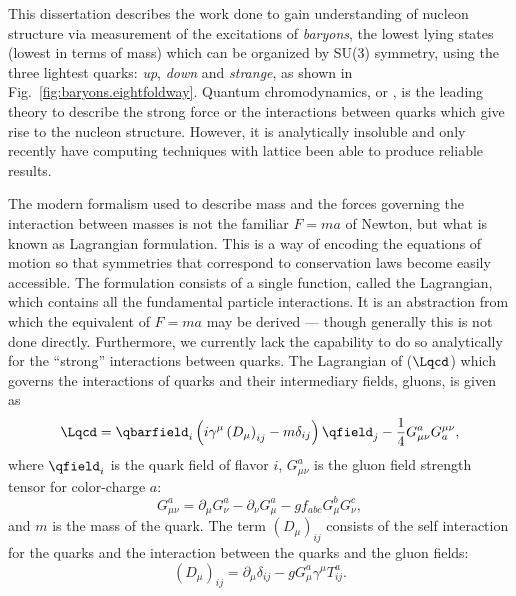 This dissertation describes the work done to gain understanding of nucleon structure via measurement of the excitations of \emph{baryons}, the lowest lying states (lowest in terms of mass) which can be organized by SU(3) symmetry\cite{hassani2000}, using the three lightest quarks: \emph{up}, \emph{down} and \emph{strange}, as shown in Fig.~\ref{fig:baryons.eightfoldway}. Quantum chromodynamics, or , is the leading theory to describe the strong force or the interactions between quarks which give rise to the nucleon structure. However, it is analytically insoluble and only recently have computing techniques with lattice  been able to produce reliable results.


The modern formalism used to describe mass and the forces governing the interaction between masses is not the familiar $F=ma$ of Newton, but what is known as Lagrangian formulation. This is a way of encoding the equations of motion so that symmetries that correspond to conservation laws become easily accessible. The formulation consists of a single function, called the Lagrangian, which contains all the fundamental particle interactions. It is an abstraction from which the equivalent of $F=ma$ may be derived --- though generally this is not done directly. Furthermore, we currently lack the capability to do so analytically for the ``strong'' interactions between quarks. The Lagrangian of  ($\Lqcd$) which governs the interactions of quarks and their intermediary fields, gluons, is given as
\begin{equation}
    \Lqcd =
    \qbarfield_i
    \left( i \gamma^\mu \left( D_\mu \right)_{ij} - m \delta_{ij} \right)
    \qfield_j
    - \frac{1}{4}G^{a}_{\mu\nu}G^{\mu\nu}_{a},
    \label{eqn:qcd_lagrangian}
\end{equation}
where $\qfield_i$ is the quark field of flavor $i$, $G^{a}_{\mu\nu}$ is the gluon field strength tensor for color-charge $a$:
\begin{equation}
    G^{a}_{\mu\nu} =
    \partial_\mu G^{a}_{\nu}
    - \partial_\nu G^{a}_{\mu}
    - g f_{abc} G^{b}_{\mu} G^{c}_{\nu},
    \label{eqn:gluon_field_tensor}
\end{equation}
and $m$ is the mass of the quark. The term $\left( D_\mu \right)_{ij}$ consists of the self interaction for the quarks and the interaction between the quarks and the gluon fields:
\begin{equation}
    \left( D_\mu \right)_{ij}
    = \partial_\mu \delta_{ij} - g G^a_\mu \gamma^\mu T^a_{ij}.
    \label{eqn:gellmann_derivative}
\end{equation}
